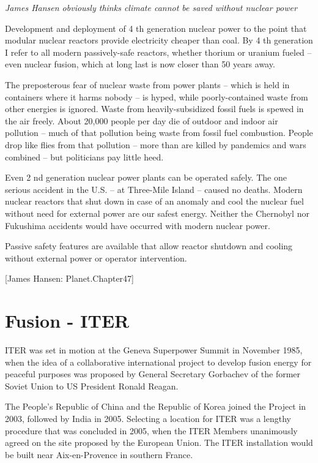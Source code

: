 \documentclass[
]{book}
\begin{document}
\emph{James Hansen obviously thinks climate cannot be saved without nuclear power}

Development and deployment of 4 th generation nuclear power to
the point that modular nuclear reactors provide electricity cheaper than coal. By 4 th generation I
refer to all modern passively-safe reactors, whether thorium or uranium fueled -- even nuclear
fusion, which at long last is now closer than 50 years away.

The preposterous fear of nuclear waste from power plants --
which is held in containers where it harms nobody -- is hyped, while poorly-contained waste
from other energies is ignored. Waste from heavily-subsidized fossil fuels is spewed in the air
freely. About 20,000 people per day die of outdoor and indoor air pollution -- much of that
pollution being waste from fossil fuel combustion. People drop like flies from that pollution --
more than are killed by pandemics and wars combined -- but politicians pay little heed.

Even 2 nd generation nuclear power
plants can be operated safely. The one serious accident in the U.S. -- at Three-Mile Island --
caused no deaths. Modern nuclear reactors that shut down in case of an anomaly and cool the
nuclear fuel without need for external power are our safest energy. Neither the Chernobyl nor
Fukushima accidents would have occurred with modern nuclear power.

Passive safety features are available that allow reactor shutdown and cooling without external
power or operator intervention.

{[}James Hansen: Planet.Chapter47{]}

\hypertarget{fusion---iter}{%
\section{Fusion - ITER}\label{fusion---iter}}

ITER was set in motion at the Geneva Superpower Summit in November 1985, when the idea of a collaborative international project to develop fusion energy for peaceful purposes was proposed by General Secretary Gorbachev of the former Soviet Union to US President Ronald Reagan.

The People's Republic of China and the Republic of Korea joined the Project in 2003, followed by India in 2005. Selecting a location for ITER was a lengthy procedure that was concluded in 2005, when the ITER Members unanimously agreed on the site proposed by the European Union. The ITER installation would be built near Aix-en-Provence in southern France.
\end{document}
